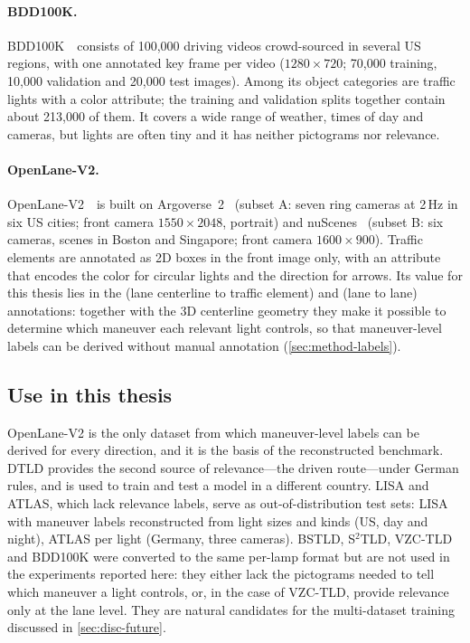\paragraph{BDD100K.} BDD100K~\cite{yu2020bdd100k}\, consists of 100,000 driving
videos crowd-sourced in several US regions, with one annotated key frame per video ($1280\times720$;
70,000 training, 10,000 validation and 20,000 test images). Among its object categories are traffic
lights with a color attribute; the training and validation splits together contain about 213,000 of
them. It covers a wide range of weather, times of day and cameras, but lights are often tiny and it has
neither pictograms nor relevance.

\paragraph{OpenLane-V2.} OpenLane-V2~\cite{wang2023openlanev2}\, is built on
Argoverse~2~\cite{wilson2021argoverse} (subset A: seven ring cameras at 2\,Hz in six US cities; front
camera $1550\times2048$, portrait) and nuScenes~\cite{caesar2020nuscenes} (subset B: six cameras,
scenes in Boston and Singapore; front camera $1600\times900$). Traffic elements are annotated as 2D
boxes in the front image only, with an attribute that encodes the color for circular lights and the
direction for arrows. Its value for this thesis lies in the  (lane centerline to
traffic element) and  (lane to lane) annotations: together with the 3D centerline
geometry they make it possible to determine which maneuver each relevant light controls, so that
maneuver-level labels can be derived without manual annotation (\cref{sec:method-labels}).

\subsection{Use in this thesis}

OpenLane-V2 is the only dataset from which maneuver-level labels can be derived for every direction,
and it is the basis of the reconstructed benchmark. DTLD provides the second source of relevance---the
driven route---under German rules, and is used to train and test a model in a different country.
LISA and ATLAS, which lack relevance labels, serve as out-of-distribution test sets: LISA with
maneuver labels reconstructed from light sizes and kinds (US, day and night), ATLAS per light (Germany,
three cameras). BSTLD, S$^2$TLD, VZC-TLD and BDD100K were converted to the same per-lamp format but
are not used in the experiments reported here: they either lack the pictograms needed to tell which
maneuver a light controls, or, in the case of VZC-TLD, provide relevance only at the lane level. They
are natural candidates for the multi-dataset training discussed in \cref{sec:disc-future}.

